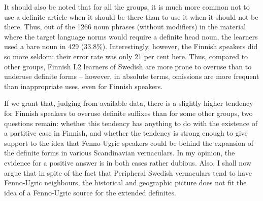 
It should also be noted that for all the groups, it is much more common not to use a definite article when it should be there than to use it when it should not be there. Thus, out of the 1266 noun phrases (without modifiers) in the material where the target language norms would require a definite head noun, the learners used a bare noun in 429 (33.8\%). Interestingly, however, the Finnish speakers did so more seldom: their error rate was only 21 per cent here. Thus, compared to other groups, Finnish L2 learners of Swedish are more prone to overuse than to underuse definite forms – however, in absolute terms, omissions are more frequent than inappropriate uses, even for Finnish speakers.  


If we grant that, judging from available data, there is a slightly higher tendency for Finnish speakers to overuse definite suffixes than for some other groups, two questions remain: whether this tendency has anything to do with the existence of a partitive case in Finnish, and whether the tendency is strong enough to give support to the idea that Fenno-Ugric speakers could be behind the expansion of the definite forms in various Scandinavian vernaculars. In my opinion, the evidence for a positive answer is in both cases rather dubious. Also, I shall now argue that in spite of the fact that Peripheral Swedish vernaculars tend to have Fenno-Ugric neighbours, the historical and geographic picture does not fit the idea of a Fenno-Ugric source for the extended definites.


